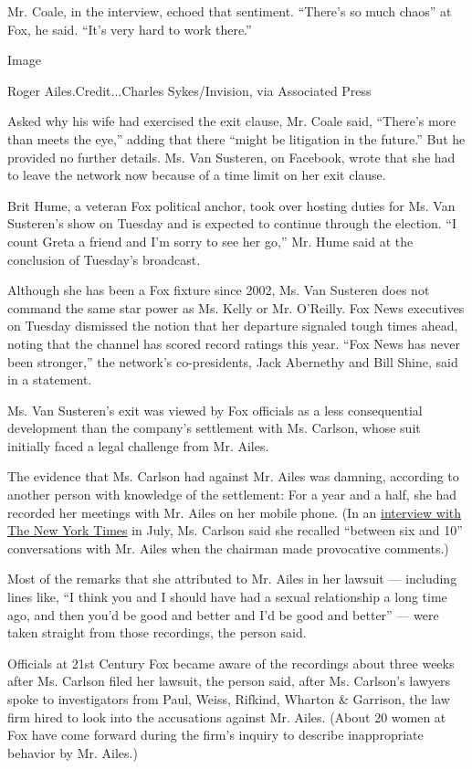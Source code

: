 Mr. Coale, in the interview, echoed that sentiment. ``There's so much
chaos'' at Fox, he said. ``It's very hard to work there.''

Image

Roger Ailes.Credit...Charles Sykes/Invision, via Associated Press

Asked why his wife had exercised the exit clause, Mr. Coale said,
``There's more than meets the eye,'' adding that there ``might be
litigation in the future.'' But he provided no further details. Ms. Van
Susteren, on Facebook, wrote that she had to leave the network now
because of a time limit on her exit clause.

Brit Hume, a veteran Fox political anchor, took over hosting duties for
Ms. Van Susteren's show on Tuesday and is expected to continue through
the election. ``I count Greta a friend and I'm sorry to see her go,''
Mr. Hume said at the conclusion of Tuesday's broadcast.

Although she has been a Fox fixture since 2002, Ms. Van Susteren does
not command the same star power as Ms. Kelly or Mr. O'Reilly. Fox News
executives on Tuesday dismissed the notion that her departure signaled
tough times ahead, noting that the channel has scored record ratings
this year. ``Fox News has never been stronger,'' the network's
co-presidents, Jack Abernethy and Bill Shine, said in a statement.

Ms. Van Susteren's exit was viewed by Fox officials as a less
consequential development than the company's settlement with Ms.
Carlson, whose suit initially faced a legal challenge from Mr. Ailes.

The evidence that Ms. Carlson had against Mr. Ailes was damning,
according to another person with knowledge of the settlement: For a year
and a half, she had recorded her meetings with Mr. Ailes on her mobile
phone. (In an
\href{http://www.nytimes3xbfgragh.onion/2016/07/13/business/media/gretchen-carlson-fox-news-interview.html}{interview
with The New York Times} in July, Ms. Carlson said she recalled
``between six and 10'' conversations with Mr. Ailes when the chairman
made provocative comments.)

Most of the remarks that she attributed to Mr. Ailes in her lawsuit ---
including lines like, ``I think you and I should have had a sexual
relationship a long time ago, and then you'd be good and better and I'd
be good and better'' --- were taken straight from those recordings, the
person said.

Officials at 21st Century Fox became aware of the recordings about three
weeks after Ms. Carlson filed her lawsuit, the person said, after Ms.
Carlson's lawyers spoke to investigators from Paul, Weiss, Rifkind,
Wharton \& Garrison, the law firm hired to look into the accusations
against Mr. Ailes. (About 20 women at Fox have come forward during the
firm's inquiry to describe inappropriate behavior by Mr. Ailes.)

